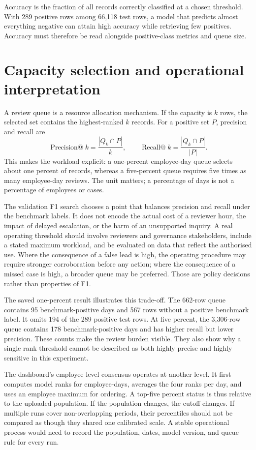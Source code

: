 Accuracy is the fraction of all records correctly classified at a
chosen threshold. With 289 positive rows among 66,118 test rows, a
model that predicts almost everything negative can attain high
accuracy while retrieving few positives. Accuracy must therefore be
read alongside positive-class metrics and queue size.

\section{Capacity selection and operational interpretation}
A review queue is a resource allocation mechanism. If the capacity is
\(k\) rows, the selected set contains the highest-ranked \(k\) records.
For a positive set \(P\), precision and recall are
\[
 \operatorname{Precision@}k=\frac{|Q_k\cap P|}{k},
 \qquad
 \operatorname{Recall@}k=\frac{|Q_k\cap P|}{|P|}.
\]
This makes the workload explicit: a one-percent employee-day queue
selects about one percent of records, whereas a five-percent queue
requires five times as many employee-day reviews. The unit matters; a
percentage of days is not a percentage of employees or cases.

The validation F1 search chooses a point that balances precision and
recall under the benchmark labels. It does not encode the actual cost
of a reviewer hour, the impact of delayed escalation, or the harm of an
unsupported inquiry. A real operating threshold should involve
reviewers and governance stakeholders, include a stated maximum
workload, and be evaluated on data that reflect the authorised use.
Where the consequence of a false lead is high, the operating procedure
may require stronger corroboration before any action; where the
consequence of a missed case is high, a broader queue may be preferred.
Those are policy decisions rather than properties of F1.

The saved one-percent result illustrates this trade-off. The 662-row
queue contains 95 benchmark-positive days and 567 rows without a
positive benchmark label. It omits 194 of the 289 positive test rows.
At five percent, the 3,306-row queue contains 178 benchmark-positive
days and has higher recall but lower precision. These counts make the
review burden visible. They also show why a single rank threshold
cannot be described as both highly precise and highly sensitive in this
experiment.

The dashboard's employee-level consensus operates at another level.
It first computes model ranks for employee-days, averages the four
ranks per day, and uses an employee maximum for ordering. A top-five
percent status is thus relative to the uploaded population. If the
population changes, the cutoff changes. If multiple runs cover
non-overlapping periods, their percentiles should not be compared as
though they shared one calibrated scale. A stable operational process
would need to record the population, dates, model version, and queue
rule for every run.

